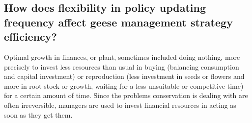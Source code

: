 \documentclass[12pt,a4paper]{article}
\begin{document}
\subsection{How does flexibility in policy updating frequency affect geese management strategy efficiency?}
Optimal growth in finances, or plant, sometimes included doing nothing, more precisely to invest less resources than usual in buying (balancing consumption and capital investment) or reproduction (less investment in seeds or flowers and more in root stock or growth, waiting for a less unsuitable or competitive time) for a certain amount of time.
Since the problems conservation is dealing with are often irreversible, managers are used to invest financial resources in acting as soon as they get them.
\end{document}
